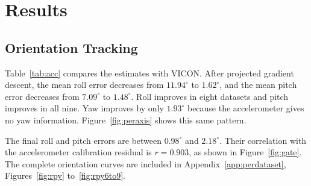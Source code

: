 \documentclass[letterpaper, 10pt, conference]{ieeeconf}
\newcommand{\dg}{^\circ}
\begin{document}
\section{Results}
\label{sec:results}

\subsection{Orientation Tracking}

Table~\ref{tab:acc} compares the estimates with VICON. After projected gradient
descent, the mean roll error decreases from $11.94\dg$ to $1.62\dg$, and the
mean pitch error decreases from $7.09\dg$ to $1.48\dg$. Roll improves in eight
datasets and pitch improves in all nine. Yaw improves by only $1.93\dg$ because
the accelerometer gives no yaw information. Figure~\ref{fig:peraxis} shows this
same pattern.

The final roll and pitch errors are between $0.98\dg$ and $2.18\dg$. Their
correlation with the accelerometer calibration residual is $r=0.903$, as shown
in Figure~\ref{fig:gate}. The complete orientation curves are included in
Appendix~\ref{app:perdataset}, Figures~\ref{fig:rpy} to~\ref{fig:rpy6to9}.
\end{document}
